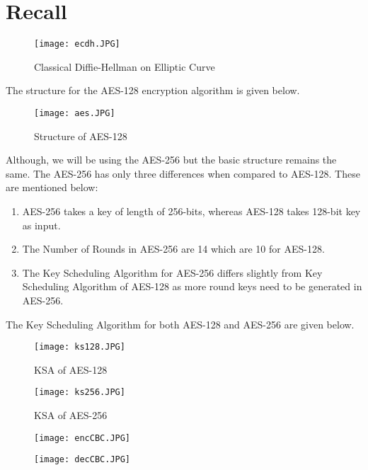 \documentclass[11pt]{article}
\begin{document}
\section{Recall}
\begin{figure}[htbp]
   \centering
   \texttt{[image: ecdh.JPG]}
   \caption{Classical Diffie-Hellman on Elliptic Curve}   
\end{figure}
The structure for the AES-128 encryption algorithm is given below.
\begin{figure}[htbp]
   \centering
   \texttt{[image: aes.JPG]}
   \caption{Structure of AES-128}   
\end{figure}
Although, we will be using the AES-256 but the basic structure remains the same. The AES-256 has only three differences when compared to AES-128. These are mentioned below:
\begin{enumerate}
    \item AES-256 takes a key of length of 256-bits, whereas AES-128 takes 128-bit key as input.
    \item The Number of Rounds in AES-256 are 14 which are 10 for AES-128.
    \item The Key Scheduling Algorithm for AES-256 differs slightly from Key Scheduling Algorithm of AES-128 as more round keys need to be generated in AES-256.
\end{enumerate}
The Key Scheduling Algorithm for both AES-128 and AES-256 are given below.\\
\newline
\begin{figure}[h]
   \centering
   \texttt{[image: ks128.JPG]}
   \caption{KSA of AES-128}   
\end{figure}
\begin{figure}[h]
   \centering
   \texttt{[image: ks256.JPG]}
   \caption{KSA of AES-256}   
\end{figure}

\begin{figure}[h]
   \centering
   \texttt{[image: encCBC.JPG]} 
\end{figure}
\begin{figure}[t]
   \centering
   \texttt{[image: decCBC.JPG]}
\end{figure}
\end{document}
